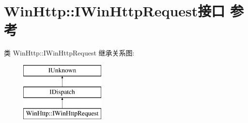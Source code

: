 \hypertarget{interface_win_http_1_1_i_win_http_request}{}\section{Win\+Http\+:\+:I\+Win\+Http\+Request接口 参考}
\label{interface_win_http_1_1_i_win_http_request}
类 Win\+Http\+:\+:I\+Win\+Http\+Request 继承关系图\+:\begin{figure}[H]
\begin{center}
\leavevmode
\includegraphics[height=3.000000cm]{interface_win_http_1_1_i_win_http_request}
\end{center}
\end{figure}
